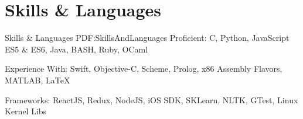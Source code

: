 \section
{Skills \&\newline
Languages}
{Skills \& Languages}
{PDF:SkillsAndLanguages}
\BulletItem
Proficient: C, Python, JavaScript ES5 \& ES6, Java, BASH, Ruby, OCaml

\GapNoBreak
\BulletItem
Experience With: Swift, Objective-C, Scheme, Prolog, x86 Assembly Flavors, MATLAB, {\LaTeX}

\GapNoBreak
\BulletItem
Frameworks: ReactJS, Redux, NodeJS, iOS SDK, SKLearn, NLTK, GTest, Linux Kernel Libs
